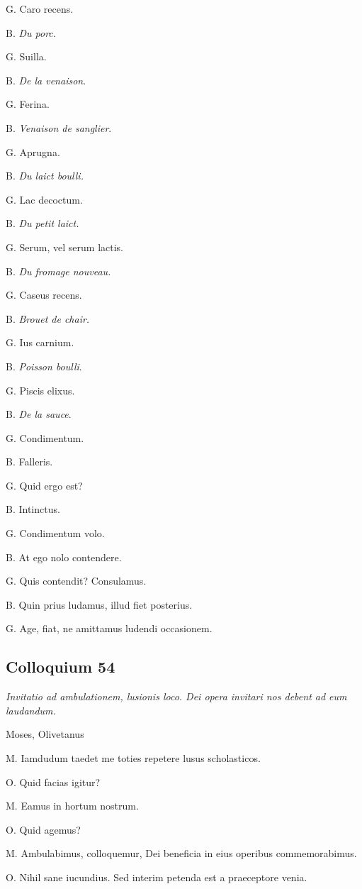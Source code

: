 \documentclass{article}
\newcommand{\fr}[1]{\foreignlanguage{french}{\emph{#1}}}
\begin{document}
G. Caro recens.

B. \fr{Du porc}.

G. Suilla.

B. \fr{De la venaison}.

G. Ferina.

B. \fr{Venaison de sanglier}.

G. Aprugna.

B. \fr{Du laict boulli.}

G. Lac decoctum.

B. \fr{Du petit laict.}

G. Serum, vel serum lactis.

B. \fr{Du fromage nouveau.}

G. Caseus recens.

B. \fr{Brouet de chair.}

G. Ius carnium.

B. \fr{Poisson boulli}.

G. Piscis elixus.

B. \fr{De la sauce}.

G. Condimentum.

B. Falleris.

G. Quid ergo est?

B. Intinctus.

G. Condimentum volo.

B. At ego nolo contendere.

G. Quis contendit? Consulamus.

B. Quin prius ludamus, illud fiet posterius.

G. Age, fiat, ne amittamus ludendi occasionem.

\subsection{Colloquium 54}
\emph{Invitatio ad ambulationem, lusionis loco. Dei opera invitari nos debent ad eum laudandum.}

Moses, Olivetanus

M. Iamdudum taedet me toties repetere lusus scholasticos.

O. Quid facias igitur?

M. Eamus in hortum nostrum.

O. Quid agemus?

M. Ambulabimus, colloquemur, Dei beneficia in eius operibus commemorabimus.

O. Nihil sane iucundius. Sed interim petenda est a praeceptore venia.
\end{document}
